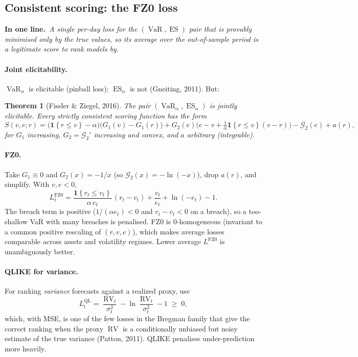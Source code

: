 \documentclass[11pt,a4paper]{article}
\newcommand{\Ind}[1]{\mathbf{1}\!\left\{#1\right\}}
\newcommand{\VaR}{\operatorname{VaR}}
\newcommand{\ES}{\operatorname{ES}}
\newcommand{\RV}{\operatorname{RV}}
\newtheorem{theorem}{Theorem}
\newcommand{\inbrief}[1]{\par\noindent\textbf{In one line.}\ \textit{#1}\par\smallskip}
\begin{document}
\subsection{Consistent scoring: the FZ0 loss}\label{sec:fz}

\inbrief{A single per-day loss for the $(\VaR,\ES)$ pair that is provably
minimised only by the true values, so its average over the out-of-sample period
is a legitimate score to rank models by.}

\paragraph{Joint elicitability.} $\VaR_\alpha$ is elicitable (pinball loss);
$\ES_\alpha$ is not (Gneiting, 2011). But:
\begin{theorem}[Fissler \& Ziegel, 2016]
The pair $(\VaR_\alpha,\ES_\alpha)$ is jointly elicitable. Every strictly
consistent scoring function has the form
\begin{equation}
  S(v,e;r) = \big(\Ind{r\le v} - \alpha\big)\big(G_1(v) - G_1(r)\big)
           + G_2(e)\Big(e - v + \tfrac1\alpha\Ind{r\le v}(v - r)\Big)
           - \mathcal G_2(e) + a(r),
\end{equation}
for $G_1$ increasing, $G_2 = \mathcal G_2'$ increasing and convex, and $a$
arbitrary (integrable).
\end{theorem}

\paragraph{FZ0.} Take $G_1\equiv0$ and $G_2(x) = -1/x$ (so
$\mathcal G_2(x) = -\ln(-x)$), drop $a(r)$, and simplify. With $v,e<0$,
\begin{equation}
  \boxed{\;
  L^{\mathrm{FZ0}}_t
   = \frac{\Ind{r_t\le v_t}}{\alpha\,e_t}\,(r_t - v_t)
   + \frac{v_t}{e_t} + \ln(-e_t) - 1 . \;}
\end{equation}
The breach term is positive ($1/(\alpha e_t)<0$ and $r_t - v_t<0$ on a breach),
so a too-shallow VaR with many breaches is penalised. FZ0 is $0$-homogeneous
(invariant to a common positive rescaling of $(r,v,e)$), which makes average
losses comparable across assets and volatility regimes. Lower average
$L^{\mathrm{FZ0}}$ is unambiguously better.

\paragraph{QLIKE for variance.} For ranking \emph{variance} forecasts against a
realized proxy, use
\begin{equation}
  L^{\mathrm{QL}}_t = \frac{\RV_t}{\sigma_t^2} - \ln\frac{\RV_t}{\sigma_t^2} - 1 \;\ge\;0,
\end{equation}
which, with MSE, is one of the few losses in the Bregman family that give the
correct ranking when the proxy $\RV$ is a conditionally unbiased but noisy
estimate of the true variance (Patton, 2011). QLIKE penalises under-prediction
more heavily.
\end{document}
